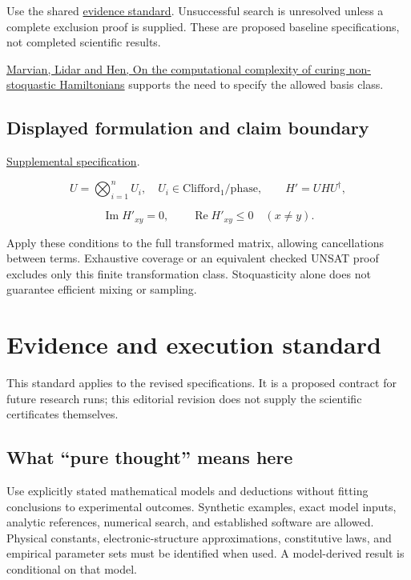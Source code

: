 \documentclass[
  11pt,
]{article}
\begin{document}
Use the shared
\href{https://github.com/rick-stevens-ai/Pure-Thought/blob/main/reviews/EVIDENCE-STANDARD.md}{evidence
standard}. Unsuccessful search is unresolved unless a complete exclusion
proof is supplied. These are proposed baseline specifications, not
completed scientific results.

\href{https://pmc.ncbi.nlm.nih.gov/articles/PMC6450938/}{Marvian, Lidar
and Hen, On the computational complexity of curing non-stoquastic
Hamiltonians} supports the need to specify the allowed basis class.

\subsection{Displayed formulation and claim boundary}

\href{https://github.com/rick-stevens-ai/Pure-Thought/blob/main/supplemental/S09.md}{Supplemental
specification}.

\[U=\bigotimes_{i=1}^nU_i,\quad U_i\in\mathrm{Clifford}_1/\mathrm{phase},
\qquad H'=UHU^\dagger,\]

\[\operatorname{Im}H'_{xy}=0,\qquad\operatorname{Re}H'_{xy}\le0\quad(x\ne y).\]

Apply these conditions to the full transformed matrix, allowing
cancellations between terms. Exhaustive coverage or an equivalent
checked UNSAT proof excludes only this finite transformation class.
Stoquasticity alone does not guarantee efficient mixing or sampling.

\section{Evidence and execution standard}

This standard applies to the revised specifications. It is a proposed
contract for future research runs; this editorial revision does not
supply the scientific certificates themselves.

\subsection{What ``pure thought'' means here}

Use explicitly stated mathematical models and deductions without fitting
conclusions to experimental outcomes. Synthetic examples, exact model
inputs, analytic references, numerical search, and established software
are allowed. Physical constants, electronic-structure approximations,
constitutive laws, and empirical parameter sets must be identified when
used. A model-derived result is conditional on that model.
\end{document}
